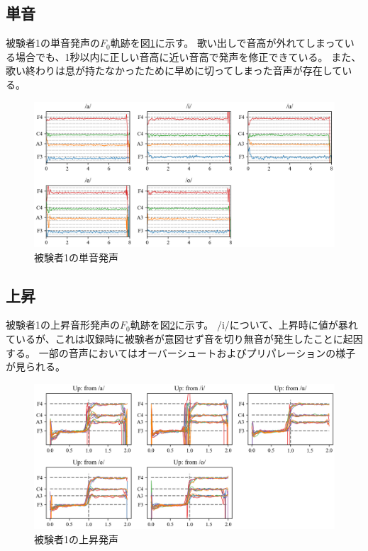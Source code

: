 \documentclass[10.5ptj,a4j,dvipdfmx,uplatex, oneside, openany, report, draft]{jsbook}%
\begin{document}
\subsection{単音}
被験者1の単音発声の$F_0$軌跡を図\ref{fig:1}に示す。
歌い出しで音高が外れてしまっている場合でも、1秒以内に正しい音高に近い音高で発声を修正できている。
また、歌い終わりは息が持たなかったために早めに切ってしまった音声が存在している。


\begin{figure}[htbp]
    \begin{center}
      \includegraphics[clip,width=16.0cm]{F0_long_1.png}
      \caption{被験者1の単音発声}
      \label{fig:1}
    \end{center}
\end{figure}

\subsection{上昇}
被験者1の上昇音形発声の$F_0$軌跡を図\ref{fig:u1}に示す。
/i/について、上昇時に値が暴れているが、これは収録時に被験者が意図せず音を切り無音が発生したことに起因する。
一部の音声においてはオーバーシュートおよびプリパレーションの様子が見られる。
\begin{figure}[htbp]
    \begin{center}
      \includegraphics[clip,width=16.0cm]{F0_up_1.png}
      \caption{被験者1の上昇発声}
      \label{fig:u1}
    \end{center}
\end{figure}
\end{document}

